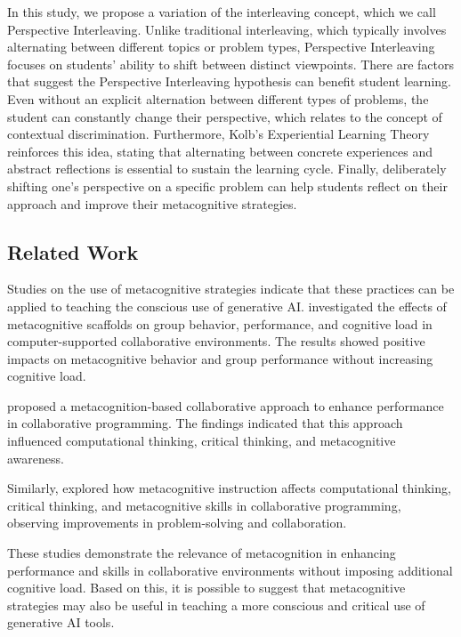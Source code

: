 \documentclass[a4paper,twoside]{article}
\begin{document}
In this study, we propose a variation of the interleaving concept, which we call
Perspective Interleaving. Unlike traditional interleaving, which typically
involves alternating between different topics or problem types, Perspective
Interleaving focuses on students' ability to shift between distinct viewpoints.
There are factors that suggest the Perspective Interleaving hypothesis can
benefit student learning. Even without an explicit alternation between different
types of problems, the student can constantly change their perspective, which
relates to the concept of contextual discrimination. Furthermore, Kolb's
Experiential Learning Theory reinforces this idea, stating that alternating
between concrete experiences and abstract reflections is essential to sustain
the learning cycle. Finally, deliberately shifting one's perspective on a
specific problem can help students reflect on their approach and improve their
metacognitive strategies.

\subsection{Related Work}

Studies on the use of metacognitive strategies indicate that these practices can
be applied to teaching the conscious use of generative AI. \cite{Zheng19}
investigated the effects of metacognitive scaffolds on group behavior,
performance, and cognitive load in computer-supported collaborative
environments. The results showed positive impacts on metacognitive
behavior and group performance without increasing cognitive load.

\cite{LiWei23} proposed a metacognition-based collaborative approach to enhance
performance in collaborative programming. The findings indicated that this
approach influenced computational thinking, critical thinking, and
metacognitive awareness.

Similarly, \cite{Wang23} explored how metacognitive instruction affects
computational thinking, critical thinking, and metacognitive skills in
collaborative programming, observing improvements in problem-solving and
collaboration.

These studies demonstrate the relevance of metacognition in enhancing
performance and skills in collaborative environments without imposing additional
cognitive load. Based on this, it is possible to suggest that metacognitive
strategies may also be useful in teaching a more conscious and critical use of
generative AI tools.
\end{document}
